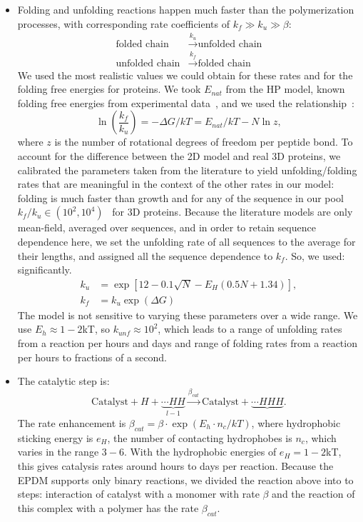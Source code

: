 \documentclass[twocolumn,letterpaper]{revtex4-1}
\newcommand*{\gD}{\Delta}
\newcommand*{\pt}[1]{\left( #1\right)}
\begin{document}
\begin{itemize}
\item Folding and unfolding reactions happen much faster than the polymerization processes, with 
corresponding rate coefficients of $k_f\gg k_{u}\gg\beta$:
\begin{equation}
\begin{split}
 \mbox{folded chain}&\xrightarrow{k_u}\mbox{unfolded chain}  \\
 \mbox{unfolded chain}&\xrightarrow{k_f}\mbox{folded chain}
\end{split}
\end{equation}
 We used the most realistic values we could obtain for these rates and for the folding free 
energies for proteins.  We took $E_{nat}$ from the HP model, known folding free energies from 
experimental data~\cite{Ghosh2010,Dill2011}, and we used the relationship~\cite{Ghosh2009}:
\begin{equation}
 \ln\pt{\frac{k_f}{k_u}}=-\gD G/kT = E_{nat}/kT-N\ln z,
\end{equation} 
 where $z$ is the number of rotational degrees of freedom per peptide bond.  To account for the 
difference between the 2D model and real 3D proteins, we calibrated the parameters taken from the 
literature to yield unfolding/folding rates that are meaningful in the context of the other rates 
in our model: folding is much faster than growth and for any of the sequence in our pool 
$k_f/k_u\in (10^2,10^4)$~\cite{Ghosh2010,Dill2011} for 3D proteins.  Because the literature models 
are only mean-field, averaged over sequences, and in order to retain sequence dependence here, we 
set the unfolding rate of all sequences to the average for their lengths, and assigned all the 
sequence dependence to $k_f$.  So, we used: 
significantly.
\begin{equation}
\begin{split}
  k_u &= \exp[12-0.1 \sqrt{N} -E_H(0.5 N + 1.34)],\\
  k_f &= k_u\exp(\gD G)
\end{split}
\end{equation}
The model is not sensitive to varying these parameters over a wide range.  We use $E_h \approx 
1-2$kT, so $k_{unf} \approx 10^2$, which leads to a range of unfolding rates from  a reaction per 
hours and days and range of folding rates from a 
reaction per hours to fractions of a second.

\item The catalytic step is:
\begin{equation}
\mbox{Catalyst}+H+ \underbrace{\cdots HH}_{l-1} 
\xrightarrow{\beta_{cat}}\mbox{Catalyst}+\underbrace{\cdots HHH}.
\end{equation}
 The rate enhancement is $\beta_{cat}=\beta\cdot\exp(E_{h}\cdot n_{c}/kT)$, where hydrophobic 
sticking energy is $e_H$, the number of contacting hydrophobes is $n_c$, which varies in the range 
$3-6$. With the hydrophobic energies of $e_H = 1-2$kT, this gives catalysis rates around hours to 
days per reaction. Because the EPDM supports only binary reactions, we divided the reaction above 
into to steps: interaction of catalyst with a monomer with rate $\beta$ and the reaction of this 
complex with a polymer has the rate $\beta_{cat}$. 
\end{itemize}
\end{document}
